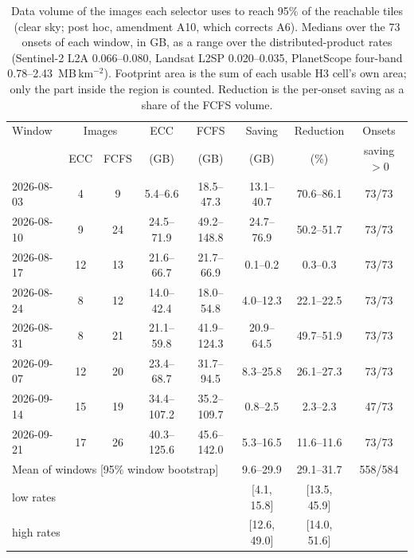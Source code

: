 \begin{table}[!t]
\centering
\footnotesize
\renewcommand{\arraystretch}{1.2}
\setlength{\tabcolsep}{4pt}
\caption{Data volume of the images each selector uses to reach 95\% of the reachable tiles (clear sky; post hoc, amendment A10, which corrects A6). Medians over the 73 onsets of each window, in GB, as a range over the distributed-product rates (Sentinel-2 L2A 0.066--0.080, Landsat L2SP 0.020--0.035, PlanetScope four-band 0.78--2.43~MB\,km$^{-2}$). Footprint area is the sum of each usable H3 cell's own area; only the part inside the region is counted. Reduction is the per-onset saving as a share of the FCFS volume.}
\label{tab:a10_volume}
\begin{tabular}{|l|c|c|c|c|c|c|c|}
\hline
Window & \multicolumn{2}{c|}{Images} & ECC & FCFS & Saving & Reduction & Onsets \\
 & ECC & FCFS & (GB) & (GB) & (GB) & (\%) & saving $>0$ \\
\hline
2026-08-03 & 4 & 9 & 5.4--6.6 & 18.5--47.3 & 13.1--40.7 & 70.6--86.1 & 73/73 \\
\hline
2026-08-10 & 9 & 24 & 24.5--71.9 & 49.2--148.8 & 24.7--76.9 & 50.2--51.7 & 73/73 \\
\hline
2026-08-17 & 12 & 13 & 21.6--66.7 & 21.7--66.9 & 0.1--0.2 & 0.3--0.3 & 73/73 \\
\hline
2026-08-24 & 8 & 12 & 14.0--42.4 & 18.0--54.8 & 4.0--12.3 & 22.1--22.5 & 73/73 \\
\hline
2026-08-31 & 8 & 21 & 21.1--59.8 & 41.9--124.3 & 20.9--64.5 & 49.7--51.9 & 73/73 \\
\hline
2026-09-07 & 12 & 20 & 23.4--68.7 & 31.7--94.5 & 8.3--25.8 & 26.1--27.3 & 73/73 \\
\hline
2026-09-14 & 15 & 19 & 34.4--107.2 & 35.2--109.7 & 0.8--2.5 & 2.3--2.3 & 47/73 \\
\hline
2026-09-21 & 17 & 26 & 40.3--125.6 & 45.6--142.0 & 5.3--16.5 & 11.6--11.6 & 73/73 \\
\hline
\multicolumn{5}{|l|}{Mean of windows [95\% window bootstrap]} & 9.6--29.9 & 29.1--31.7 & 558/584 \\
\hline
\multicolumn{5}{|l|}{\quad low rates} & [4.1, 15.8] & [13.5, 45.9] & \\
\hline
\multicolumn{5}{|l|}{\quad high rates} & [12.6, 49.0] & [14.0, 51.6] & \\
\hline
\end{tabular}
\end{table}
